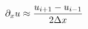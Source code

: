 \documentclass[preview]{standalone}
\begin{document}
\begin{align*}
\special{dvisvgm:raw <g id='unique000'>}\partial_x u \approx \frac{u_{i+1}-u_{i-1}}{2\Delta x}\special{dvisvgm:raw </g>}
\end{align*}
\end{document}
